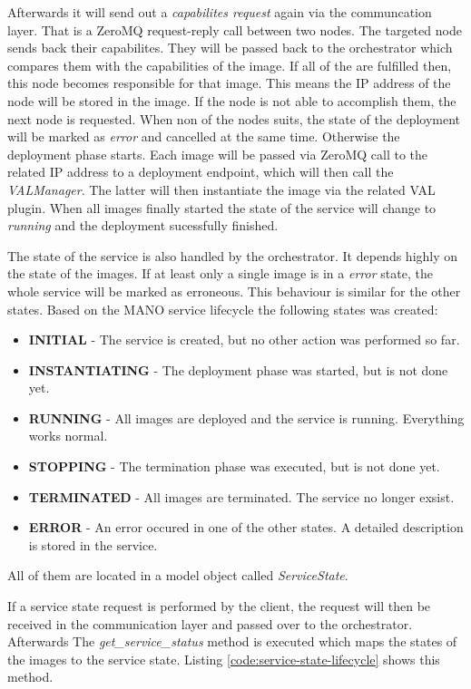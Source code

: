 Afterwards it will send out a \textit{capabilites request} again via the communcation layer.
That is a ZeroMQ request-reply call between two nodes.
The targeted node sends back their capabilites.
They will be passed back to the orchestrator which compares them with the capabilities of the image.
If all of the are fulfilled then, this node becomes responsible for that image.
This means the \ac{IP} address of the node will be stored in the image.
If the node is not able to accomplish them, the next node is requested.
When non of the nodes suits, the state of the deployment will be marked as \textit{error} and cancelled at the same time.
Otherwise the deployment phase starts.
Each image will be passed via ZeroMQ call to the related \ac{IP} address to a deployment endpoint, which will then call the \textit{VALManager}.
The latter will then instantiate the image via the related \ac{VAL} plugin.
When all images finally started the state of the service will change to \textit{running} and the deployment sucessfully finished.

The state of the service is also handled by the orchestrator.
It depends highly on the state of the images.
If at least only a single image is in a \textit{error} state, the whole service will be marked as erroneous.
This behaviour is similar for the other states.
Based on the \ac{MANO} service lifecycle the following states was created:

\begin{itemize}
  \item \textbf{INITIAL} - The service is created, but no other action was performed so far.
  \item \textbf{INSTANTIATING} - The deployment phase was started, but is not done yet.
  \item \textbf{RUNNING} - All images are deployed and the service is running. Everything works normal.
  \item \textbf{STOPPING} - The termination phase was executed, but is not done yet.
  \item \textbf{TERMINATED} - All images are terminated. The service no longer exsist.
  \item \textbf{ERROR} - An error occured in one of the other states. A detailed description is stored in the service.
\end{itemize}

All of them are located in a model object called \textit{ServiceState}.

If a service state request is performed by the client, the request will then be received in the communication layer and passed over to the orchestrator.
Afterwards The \textit{get\_service\_status} method is executed which maps the states of the images to the service state.
Listing \ref{code:service-state-lifecycle} shows this method.

